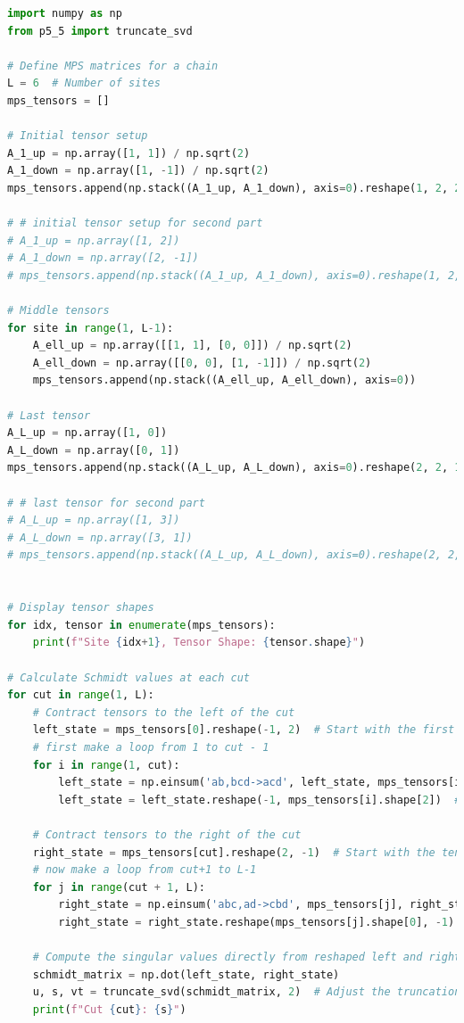 \documentclass[12pt]{article}
\begin{document}
\begin{lstlisting}[language=Python]
import numpy as np
from p5_5 import truncate_svd

# Define MPS matrices for a chain
L = 6  # Number of sites
mps_tensors = []

# Initial tensor setup
A_1_up = np.array([1, 1]) / np.sqrt(2)
A_1_down = np.array([1, -1]) / np.sqrt(2)
mps_tensors.append(np.stack((A_1_up, A_1_down), axis=0).reshape(1, 2, 2))  # First tensor

# # initial tensor setup for second part
# A_1_up = np.array([1, 2])
# A_1_down = np.array([2, -1])
# mps_tensors.append(np.stack((A_1_up, A_1_down), axis=0).reshape(1, 2, 2))  # First tensor

# Middle tensors
for site in range(1, L-1):
    A_ell_up = np.array([[1, 1], [0, 0]]) / np.sqrt(2)
    A_ell_down = np.array([[0, 0], [1, -1]]) / np.sqrt(2)
    mps_tensors.append(np.stack((A_ell_up, A_ell_down), axis=0))

# Last tensor
A_L_up = np.array([1, 0])
A_L_down = np.array([0, 1])
mps_tensors.append(np.stack((A_L_up, A_L_down), axis=0).reshape(2, 2, 1))  # Last tensor

# # last tensor for second part
# A_L_up = np.array([1, 3])
# A_L_down = np.array([3, 1])
# mps_tensors.append(np.stack((A_L_up, A_L_down), axis=0).reshape(2, 2, 1))  # Last tensor


# Display tensor shapes
for idx, tensor in enumerate(mps_tensors):
    print(f"Site {idx+1}, Tensor Shape: {tensor.shape}")

# Calculate Schmidt values at each cut
for cut in range(1, L):
    # Contract tensors to the left of the cut
    left_state = mps_tensors[0].reshape(-1, 2)  # Start with the first tensor reshaped for matrix multiplication
    # first make a loop from 1 to cut - 1
    for i in range(1, cut):
        left_state = np.einsum('ab,bcd->acd', left_state, mps_tensors[i])
        left_state = left_state.reshape(-1, mps_tensors[i].shape[2])  # Ensure correct shape

    # Contract tensors to the right of the cut
    right_state = mps_tensors[cut].reshape(2, -1)  # Start with the tensor at the cut
    # now make a loop from cut+1 to L-1
    for j in range(cut + 1, L):
        right_state = np.einsum('abc,ad->cbd', mps_tensors[j], right_state)
        right_state = right_state.reshape(mps_tensors[j].shape[0], -1)  # Ensure correct shape

    # Compute the singular values directly from reshaped left and right states
    schmidt_matrix = np.dot(left_state, right_state)
    u, s, vt = truncate_svd(schmidt_matrix, 2)  # Adjust the truncation
    print(f"Cut {cut}: {s}")

\end{lstlisting}
\end{document}
